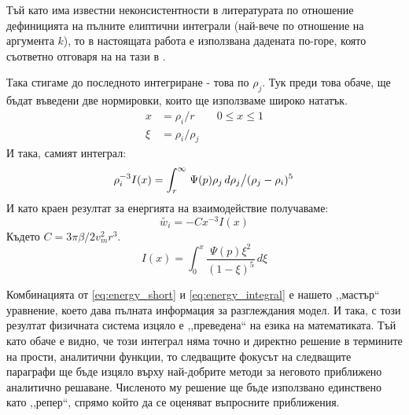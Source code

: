 Тъй като има известни неконсистентности в литературата по отношение дефиницията на пълните елиптични интеграли (най-вече по отношение на аргумента $k$), то в настоящата работа е използвана дадената по-горе, която съответно отговаря на на тази в \cite{gradshteyn}.

Така стигаме до последното интегриране - това по $\rho_j$. Тук преди това обаче, ще бъдат въведени две нормировки, които ще използваме широко нататък.
\begin{align*}
	x & = \rho_i/r &   & 0 \le x \le 1 \\
	\xi &= \rho_i/\rho_j
\end{align*}
И така, самият интеграл:
\begin{equation}
	\rho_{i}^{-3} I(x) = \displaystyle\int_{r}^{\infty} \left. \Psi(p)\rho_j \,d\rho_j \middle/ (\rho_j-\rho_i)^5 \right.
	\label{eq:integral_energy_non_normalized}
\end{equation}
И като краен резултат за енергията на взаимодействие получаваме:
\begin{equation}
	\tilde{w_i} = -C x^{-3} I(x) 
	\label{eq:energy_short}
\end{equation}
Където $ C = 3 \pi \beta / 2 v_{m}^2 r^3 $.
\begin{equation}
	I(x) = \displaystyle\int_{0}^{x} \frac{\Psi(p) \xi^2}{(1-\xi)^5}  \,d\xi
	\label{eq:energy_integral}
\end{equation}

Комбинацията от \autoref{eq:energy_short} и \autoref{eq:energy_integral} е нашето ,,мастър`` уравнение, което дава пълната информация за разглеждания модел.
И така, с този резултат физичната система изцяло е ,,преведена`` на езика на математиката. Тъй като обаче е видно, че този интеграл няма точно и директно решение в термините на прости, 
аналитични функции, то следващите фокусът на следващите параграфи ще бъде изцяло върху най-добрите методи за неговото приближено аналитично решаване. Численото му решение ще бъде използвано
единствено като ,,репер``, спрямо който да се оценяват въпросните приближения.

